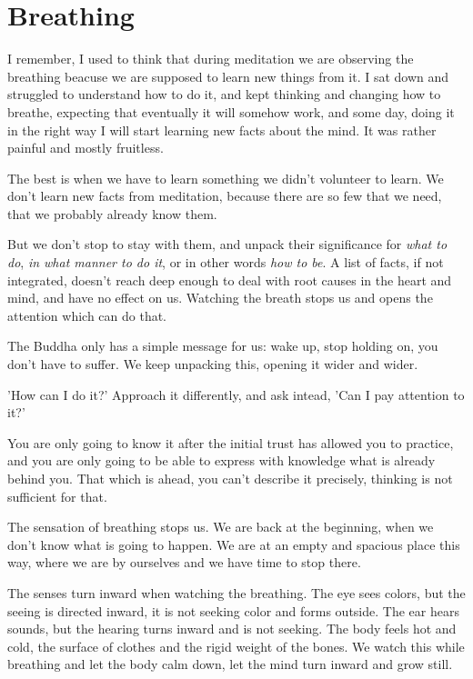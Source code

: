 \hypertarget{breathing-1}{%
\chapter{Breathing}\label{breathing-1}}

I remember, I used to think that during meditation we are observing the
breathing beacuse we are supposed to learn new things from it. I sat
down and struggled to understand how to do it, and kept thinking and
changing how to breathe, expecting that eventually it will somehow work,
and some day, doing it in the right way I will start learning new facts
about the mind. It was rather painful and mostly fruitless.

The best is when we have to learn something we didn't volunteer to
learn. We don't learn new facts from meditation, because there are so
few that we need, that we probably already know them.

But we don't stop to stay with them, and unpack their significance for
\emph{what to do}, \emph{in what manner to do it}, or in other words
\emph{how to be}. A list of facts, if not integrated, doesn't reach deep
enough to deal with root causes in the heart and mind, and have no
effect on us. Watching the breath stops us and opens the attention which
can do that.

The Buddha only has a simple message for us: wake up, stop holding on,
you don't have to suffer. We keep unpacking this, opening it wider and
wider.

'How can I do it?' Approach it differently, and ask intead, 'Can I pay
attention to it?'

You are only going to know it after the initial trust has allowed you to
practice, and you are only going to be able to express with knowledge
what is already behind you. That which is ahead, you can't describe it
precisely, thinking is not sufficient for that.

The sensation of breathing stops us. We are back at the beginning, when
we don't know what is going to happen. We are at an empty and spacious
place this way, where we are by ourselves and we have time to stop
there.

The senses turn inward when watching the breathing. The eye sees colors,
but the seeing is directed inward, it is not seeking color and forms
outside. The ear hears sounds, but the hearing turns inward and is not
seeking. The body feels hot and cold, the surface of clothes and the
rigid weight of the bones. We watch this while breathing and let the
body calm down, let the mind turn inward and grow still.

